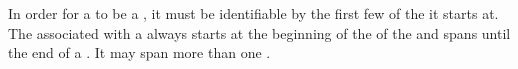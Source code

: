 In order for a  to be a , it must be identifiable by the first few  of the  it starts at. The  associated with a  always starts at the beginning of the  of the  and spans until the end of a . It may span more than one .

